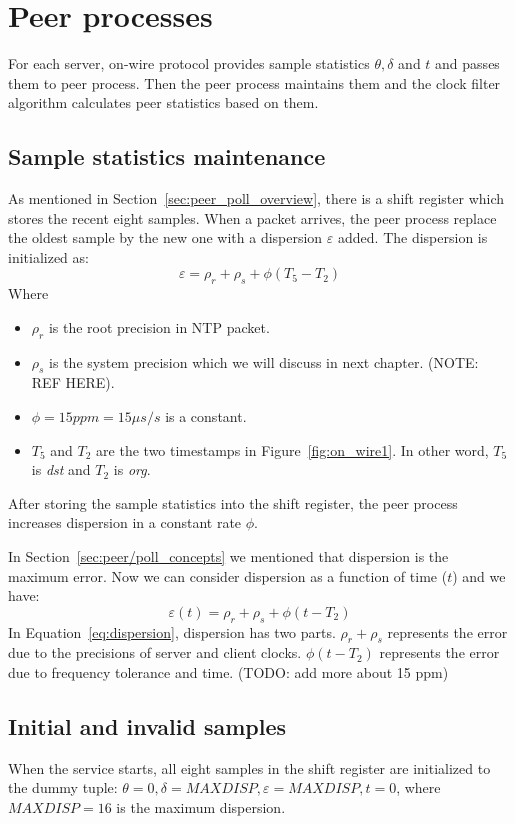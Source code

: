 \section{Peer processes}%
\label{sec:peer_processes}
For each server, on-wire protocol provides sample statistics $\theta, \delta$
and $t$ and passes them to peer process. Then the peer process maintains them
and the clock filter algorithm calculates peer statistics based on them.

\subsection{Sample statistics maintenance}%
\label{sub:sample_statistics_maintenance}
As mentioned in Section~\ref{sec:peer_poll_overview}, there is a shift register
which stores the recent eight samples. When a packet arrives, the peer process
replace the oldest sample by the new one with a dispersion $\varepsilon$ added.
The dispersion is initialized as:
$$ \varepsilon = \rho_r + \rho_s + \phi (T_5 - T_2) $$
Where 
\begin{itemize}
    \item 
        $\rho_r$ is the root precision in NTP packet. 
    \item 
        $\rho_s$ is the system
        precision which we will discuss in next chapter. (NOTE: REF HERE).
    \item
        $\phi = 15 ppm = 15 \mu s/s$ is a constant.
    \item
        $T_5$ and $T_2$ are the two timestamps in Figure~\ref{fig:on_wire1}. In
        other word, $T_5$ is \emph{dst} and $T_2$ is \emph{org}.
\end{itemize}
After storing the sample statistics into the shift register, the peer process
increases dispersion in a constant rate $\phi$.

In Section~\ref{sec:peer/poll_concepts} we mentioned that dispersion is the
maximum error. Now we can consider dispersion as a function of time ($t$) and
we have:
\begin{equation}
    \varepsilon(t) = \rho_r + \rho_s + \phi (t - T_2)
    \label{eq:dispersion}
\end{equation}
In Equation~\ref{eq:dispersion}, dispersion has two parts. $\rho_r + \rho_s$
represents the error due to the precisions of server and client clocks. $\phi
(t - T_2)$ represents the error due to frequency tolerance and time.
(TODO: add more about 15 ppm)

\subsection{Initial and invalid samples}%
\label{sub:initial_and_invalid_samples}
When the service starts, all eight samples in the shift register are
initialized to the dummy tuple: $\theta = 0, \delta = MAXDISP, \varepsilon =
MAXDISP, t = 0$, where $MAXDISP = 16$ is the maximum dispersion.~\cite{rfc5905} 


